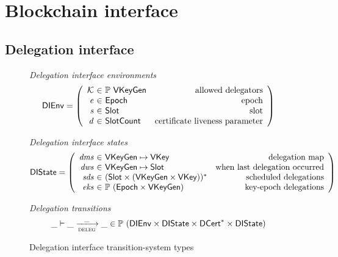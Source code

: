 \section{Blockchain interface}
\label{sec:blockchain-interface}

\newcommand{\DIEnv}{\type{DIEnv}}
\newcommand{\DIState}{\type{DIState}}

\subsection{Delegation interface}
\label{sec:delegation-interface}

\begin{figure}[htb]
  \emph{Delegation interface environments}
  \begin{equation*}
    \DIEnv =
    \left(
      \begin{array}{r@{~\in~}lr}
        \mathcal{K} & \powerset{\VKeyGen} & \text{allowed delegators}\\
        \var{e} & \Epoch & \text{epoch}\\
        \var{s} & \Slot & \text{slot}\\
        \var{d} & \SlotCount & \text{certificate liveness parameter}
      \end{array}
    \right)
  \end{equation*}

  \emph{Delegation interface states}
  \begin{equation*}
    \DIState
    = \left(
      \begin{array}{r@{~\in~}lr}
        \var{dms} & \VKeyGen \mapsto \VKey & \text{delegation map}\\
        \var{dws} & \VKeyGen \mapsto \Slot & \text{when last delegation occurred}\\
        \var{sds} & \seqof{(\Slot \times (\VKeyGen \times \VKey))} & \text{scheduled delegations}\\
        \var{eks} & \powerset{(\Epoch \times \VKeyGen)} & \text{key-epoch delegations}
      \end{array}
    \right)
  \end{equation*}

  \emph{Delegation transitions}
  \begin{equation*}
    \_ \vdash \_ \trans{deleg}{\_} \_ \in
    \powerset (\DIEnv \times \DIState \times \seqof{\DCert} \times \DIState)
  \end{equation*}
  \caption{Delegation interface transition-system types}
  \label{fig:ts-types:delegation-interface}
\end{figure}

